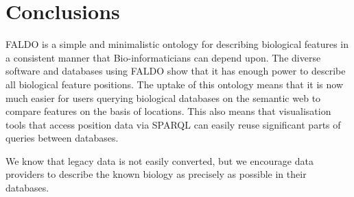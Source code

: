 \section*{Conclusions}
FALDO is a simple and minimalistic ontology for describing biological features in a consistent manner that Bio-informaticians can depend upon.
The diverse software and databases using FALDO show that it has enough power to describe all biological feature positions.
The uptake of this ontology means that it is now much easier for users querying biological databases on the semantic web to compare features on the basis of locations. This also means that visualisation tools that access position data via SPARQL can easily reuse significant parts of queries between databases.

We know that legacy data is not easily converted, but we encourage data providers to describe the known biology as precisely as possible in their databases.